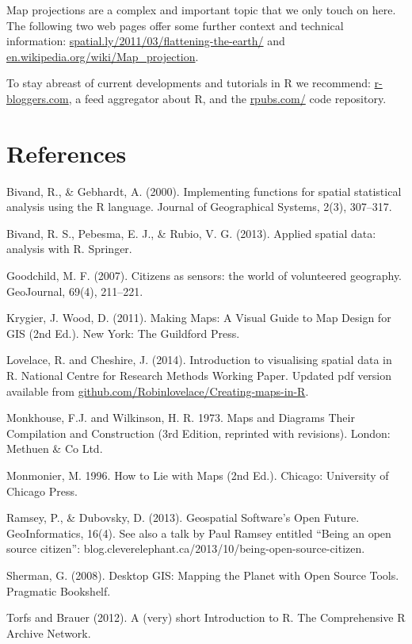 \documentclass[]{article}
\begin{document}
Map projections are a complex and important topic that we only touch on here. The following two web pages offer some further context and technical information:
\href{http://spatial.ly/2011/03/flattening-the-earth/}{spatial.ly/2011/03/flattening-the-earth/}
and \href{http://en.wikipedia.org/wiki/Map_projection}{en.wikipedia.org/wiki/Map\_projection}.


To stay abreast of current developments and tutorials in R we recommend:
\href{http://www.r-bloggers.com/}{r-bloggers.com}, a feed aggregator about R, and 
the \href{https://rpubs.com/}{rpubs.com/}
code repository.

\section{References}

Bivand, R., \& Gebhardt, A. (2000). Implementing functions for spatial
statistical analysis using the R language. Journal of Geographical
Systems, 2(3), 307--317.

Bivand, R. S., Pebesma, E. J., \& Rubio, V. G. (2013). Applied spatial
data: analysis with R. Springer.

Goodchild, M. F. (2007). Citizens as sensors: the world of volunteered
geography. GeoJournal, 69(4), 211--221.

Krygier, J. Wood, D. (2011). Making Maps: A Visual Guide to Map Design
for GIS (2nd Ed.). New York: The Guildford Press.

Lovelace, R. and Cheshire, J. (2014). Introduction to visualising
spatial data in R. National Centre for Research Methods Working Paper.
Updated pdf version available from
\href{https://github.com/Robinlovelace/Creating-maps-in-R}{github.com/Robinlovelace/Creating-maps-in-R}.

Monkhouse, F.J. and Wilkinson, H. R. 1973. Maps and Diagrams Their
Compilation and Construction (3rd Edition, reprinted with revisions).
London: Methuen \& Co Ltd.

Monmonier, M. 1996. How to Lie with Maps (2nd Ed.). Chicago: University
of Chicago Press.

Ramsey, P., \& Dubovsky, D. (2013). Geospatial Software's Open Future.
GeoInformatics, 16(4). See also a talk by Paul Ramsey entitled ``Being
an open source citizen'':
blog.cleverelephant.ca/2013/10/being-open-source-citizen.

Sherman, G. (2008). Desktop GIS: Mapping the Planet with Open Source
Tools. Pragmatic Bookshelf.

Torfs and Brauer (2012). A (very) short Introduction to R. The
Comprehensive R Archive Network.
\end{document}
